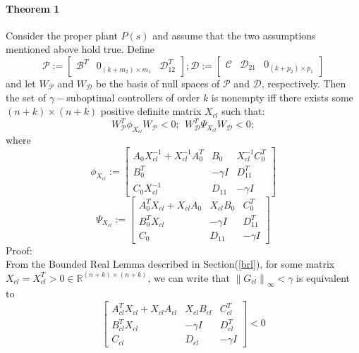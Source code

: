 \documentclass[a4paper,12pt]{article}
\newcommand\norm[1]{\left\lVert#1\right\rVert}
\begin{document}
		\paragraph{Theorem 1}
		Consider the proper plant $P(s)$ and assume that the two assumptions mentioned above hold true. Define
		\[
		\mathscr{P}:=
		\begin{bmatrix}
		\mathscr{B}^{T} & 0_{(k+m_{2})\times m_{1}} & \mathscr{D}_{12}^{T}
		\end{bmatrix};
		\mathscr{D}:=
		\begin{bmatrix}
		\mathscr{C} & \mathscr{D}_{21} & 0_{(k+p_{2})\times p_{1}}
		\end{bmatrix}
		\]
		and let $W_{\mathscr{P}}$ and $W_{\mathscr{D}}$ be the basis of null spaces of $\mathscr{P}$ and $\mathscr{D}$, respectively. Then the set of $\gamma-$suboptimal controllers of order $k$ is nonempty iff there exists some $(n+k) \times (n+k)$ positive definite matrix $X_{cl}$ such that:
		\begin{equation}
		W_{\mathscr{P}}^{T}\phi_{X_{cl}}W_{\mathscr{P}} < 0; \: \: W_{\mathscr{D}}^{T}\Psi_{X_{cl}}W_{\mathscr{D}} < 0; 
		\end{equation}
		where
		\begin{equation}
		\phi_{X_{cl}} :=
		\begin{bmatrix}
			A_{0}X_{cl}^{-1}+X_{cl}^{-1}A_{0}^{T} & B_{0} & X_{cl}^{-1}C_{0}^{T} \\
			B_{0}^{T} & -\gamma I & D_{11}^{T} \\
			C_{0}X_{cl}^{-1} & D_{11} & -\gamma I
		\end{bmatrix}
		\label{phixcl}
		\end{equation}
		\begin{equation}
		\Psi_{X_{cl}} :=
		\begin{bmatrix}
			A_{0}^{T}X_{cl}+X_{cl}A_{0} & X_{cl}B_{0} & C_{0}^{T} \\
			B_{0}^{T}X_{cl} & -\gamma I & D_{11}^{T} \\
			C_{0} & D_{11} & -\gamma I
		\end{bmatrix}
		\label{sixcl}
		\end{equation}
		Proof: \\
		From the Bounded Real Lemma described in Section(\ref{brl}), for some matrix $X_{cl} = X_{cl}^{T} > 0 \in \mathbb{R}^{(n+k) \times (n+k)}$, we can write that $\norm{G_{cl}}_{\infty} < \gamma$ is equivalent to
		\begin{equation}
		\begin{bmatrix}
		A_{cl}^{T}X_{cl}+X_{cl}A_{cl} & X_{cl}B_{cl} & C_{cl}^{T} \\
			B_{cl}^{T}X_{cl} & -\gamma I & D_{cl}^{T} \\
			C_{cl} & D_{cl} & -\gamma I
		\end{bmatrix}
		< 0
		\label{xcl}
		\end{equation}
\end{document}
